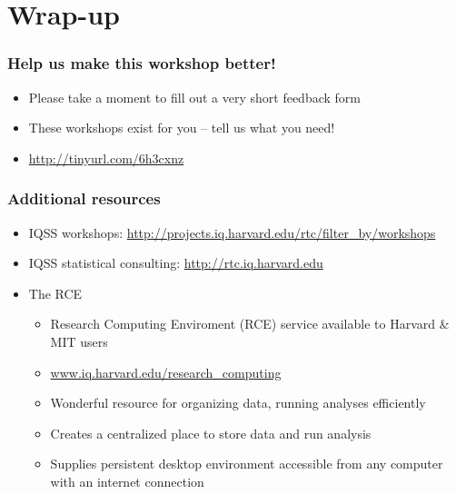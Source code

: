 \documentclass[table]{beamer}
\begin{document}
\section{Wrap-up}
\label{sec-5}
\begin{frame}
\frametitle{Help us make this workshop better!}
\label{sec-5-1}


\begin{itemize}
\item Please take a moment to fill out a very short feedback form
\item These workshops exist for you – tell us what you need!
\item \href{http://tinyurl.com/6h3cxnz}{http://tinyurl.com/6h3cxnz}
\end{itemize}
\end{frame}
\begin{frame}
\frametitle{Additional resources}
\label{sec-5-2}


\begin{itemize}
\item IQSS workshops: \href{http://projects.iq.harvard.edu/rtc/filter_by/workshops}{http://projects.iq.harvard.edu/rtc/filter\_by/workshops}
\item IQSS statistical consulting: \href{http://rtc.iq.harvard.edu}{http://rtc.iq.harvard.edu}
\item The RCE
\begin{itemize}
\item Research Computing Enviroment (RCE) service available to Harvard \& MIT users
\item \hyperref[www.iq.harvard.edu-research_computing]{www.iq.harvard.edu/research\_computing}
\item Wonderful resource for organizing data, running analyses efficiently
\item Creates a centralized place to store data and run analysis
\item Supplies persistent desktop environment accessible from any computer with an internet connection
\end{itemize}
\end{itemize}
\end{frame}
\end{document}
